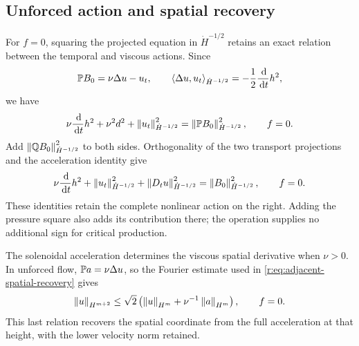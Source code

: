 \subsection{Unforced action and spatial recovery}

For \(f=0\), squaring the projected equation in
\(\dot H^{-1/2}\) retains an exact relation between the temporal
and viscous actions.  Since
\[
 \mathbb P B_0=\nu\Delta u-u_t,\qquad
 \left\langle \Delta u,u_t\right\rangle_{\dot H^{-1/2}}
 =-\frac12\frac{\,\mathrm d}{\,\mathrm d t}h^2,
\]
we have
\begin{equation}
 \nu\frac{\,\mathrm d}{\,\mathrm d t}h^2+\nu^2d^2
 +\left\lVert u_t\right\rVert_{\dot H^{-1/2}}^2
 =\left\lVert \mathbb P B_0\right\rVert_{\dot H^{-1/2}}^2,
 \qquad f=0.
 \label{r:eq:unforced-critical-action}
\end{equation}
Add \(\left\lVert \mathbb QB_0\right\rVert_{\dot H^{-1/2}}^2\) to both sides.
Orthogonality of the two transport projections and the acceleration
identity give
\begin{equation}
 \nu\frac{\,\mathrm d}{\,\mathrm d t}h^2
 +\left\lVert u_t\right\rVert_{\dot H^{-1/2}}^2
 +\left\lVert D_tu\right\rVert_{\dot H^{-1/2}}^2
 =\left\lVert B_0\right\rVert_{\dot H^{-1/2}}^2,
 \qquad f=0.
 \label{r:eq:unforced-material-critical-action}
\end{equation}
These identities retain the complete nonlinear action on the right.
Adding the pressure square also adds its contribution there; the
operation supplies no additional sign for critical production.

The solenoidal acceleration determines the viscous spatial derivative
when \(\nu>0\).  In unforced flow,
\(\mathbb P a=\nu\Delta u\), so the Fourier estimate used in
\eqref{r:eq:adjacent-spatial-recovery} gives
\begin{equation}
 \left\lVert u\right\rVert_{H^{m+2}}
 \le\sqrt2\left(\left\lVert u\right\rVert_{H^m}
                  +\nu^{-1}\left\lVert a\right\rVert_{H^m}\right),
 \qquad f=0.
 \label{r:eq:unforced-spatial-recovery-from-acceleration}
\end{equation}
This last relation recovers the spatial coordinate from the full
acceleration at that height, with the lower velocity norm retained.
